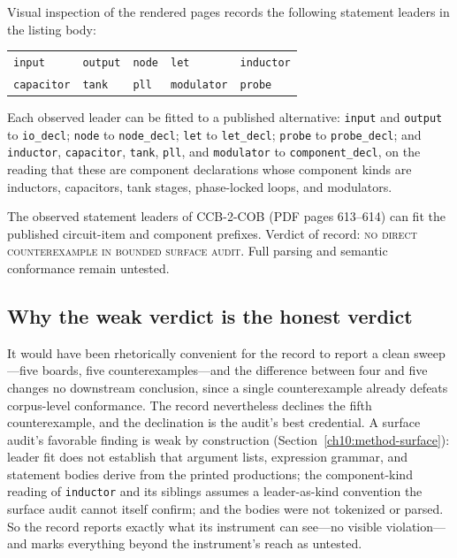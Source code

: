 Visual inspection of the rendered pages records the following statement leaders in the listing body:

\begin{center}
\begin{tabular}{@{}lllll@{}}
\toprule
\texttt{input} & \texttt{output} & \texttt{node} & \texttt{let} & \texttt{inductor} \\
\texttt{capacitor} & \texttt{tank} & \texttt{pll} & \texttt{modulator} & \texttt{probe} \\
\bottomrule
\end{tabular}
\end{center}

Each observed leader can be fitted to a published alternative: \texttt{input} and \texttt{output} to \texttt{io\_decl}; \texttt{node} to \texttt{node\_decl}; \texttt{let} to \texttt{let\_decl}; \texttt{probe} to \texttt{probe\_decl}; and \texttt{inductor}, \texttt{capacitor}, \texttt{tank}, \texttt{pll}, and \texttt{modulator} to \texttt{component\_decl}, on the reading that these are component declarations whose component kinds are inductors, capacitors, tank stages, phase-locked loops, and modulators.

\begin{finding}\label{ch10:find-ccb2}
The observed statement leaders of CCB-2-COB (PDF pages 613--614) can fit the published circuit-item and component prefixes. Verdict of record: \textsc{no direct counterexample in bounded surface audit}. Full parsing and semantic conformance remain untested.
\end{finding}

\subsection{Why the weak verdict is the honest verdict}

It would have been rhetorically convenient for the record to report a clean sweep---five boards, five counterexamples---and the difference between four and five changes no downstream conclusion, since a single counterexample already defeats corpus-level conformance. The record nevertheless declines the fifth counterexample, and the declination is the audit's best credential. A surface audit's favorable finding is weak by construction (Section~\ref{ch10:method-surface}): leader fit does not establish that argument lists, expression grammar, and statement bodies derive from the printed productions; the component-kind reading of \texttt{inductor} and its siblings assumes a leader-as-kind convention the surface audit cannot itself confirm; and the bodies were not tokenized or parsed. So the record reports exactly what its instrument can see---no visible violation---and marks everything beyond the instrument's reach as untested.

